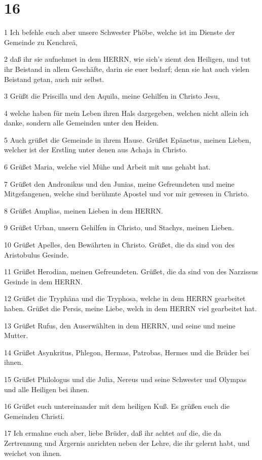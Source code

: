 \chapter{16}

\par 1 Ich befehle euch aber unsere Schwester Phöbe, welche ist im Dienste der Gemeinde zu Kenchreä,
\par 2 daß ihr sie aufnehmet in dem HERRN, wie sich's ziemt den Heiligen, und tut ihr Beistand in allem Geschäfte, darin sie euer bedarf; denn sie hat auch vielen Beistand getan, auch mir selbst.
\par 3 Grüßt die Priscilla und den Aquila, meine Gehilfen in Christo Jesu,
\par 4 welche haben für mein Leben ihren Hals dargegeben, welchen nicht allein ich danke, sondern alle Gemeinden unter den Heiden.
\par 5 Auch grüßet die Gemeinde in ihrem Hause. Grüßet Epänetus, meinen Lieben, welcher ist der Erstling unter denen aus Achaja in Christo.
\par 6 Grüßet Maria, welche viel Mühe und Arbeit mit uns gehabt hat.
\par 7 Grüßet den Andronikus und den Junias, meine Gefreundeten und meine Mitgefangenen, welche sind berühmte Apostel und vor mir gewesen in Christo.
\par 8 Grüßet Amplias, meinen Lieben in dem HERRN.
\par 9 Grüßet Urban, unsern Gehilfen in Christo, und Stachys, meinen Lieben.
\par 10 Grüßet Apelles, den Bewährten in Christo. Grüßet, die da sind von des Aristobulus Gesinde.
\par 11 Grüßet Herodian, meinen Gefreundeten. Grüßet, die da sind von des Narzissus Gesinde in dem HERRN.
\par 12 Grüßet die Tryphäna und die Tryphosa, welche in dem HERRN gearbeitet haben. Grüßet die Persis, meine Liebe, welch in dem HERRN viel gearbeitet hat.
\par 13 Grüßet Rufus, den Auserwählten in dem HERRN, und seine und meine Mutter.
\par 14 Grüßet Asynkritus, Phlegon, Hermas, Patrobas, Hermes und die Brüder bei ihnen.
\par 15 Grüßet Philologus und die Julia, Nereus und seine Schwester und Olympas und alle Heiligen bei ihnen.
\par 16 Grüßet euch untereinander mit dem heiligen Kuß. Es grüßen euch die Gemeinden Christi.
\par 17 Ich ermahne euch aber, liebe Brüder, daß ihr achtet auf die, die da Zertrennung und Ärgernis anrichten neben der Lehre, die ihr gelernt habt, und weichet von ihnen.
